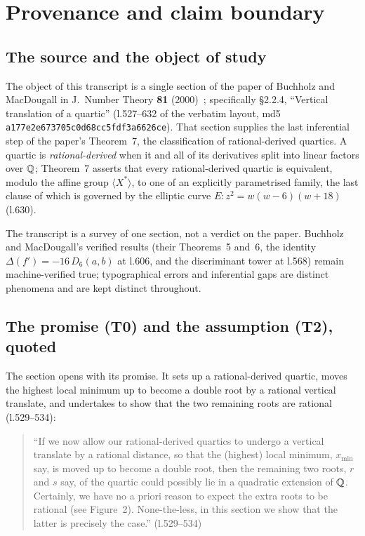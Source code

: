 \chapter{Provenance and claim boundary}\label{chap:provenance}

\section{The source and the object of study}

The object of this transcript is a single section of the paper of Buchholz and
MacDougall in J.\ Number Theory \textbf{81} (2000)~\cite{BuchholzMacDougall2000};
specifically \S2.2.4, ``Vertical translation of a quartic'' (l.527--632 of the
verbatim layout, md5 \texttt{a177e2e673705c0d68cc5fdf3a6626ce}).  That section supplies the last
inferential step of the paper's Theorem~7, the classification of rational-derived
quartics.  A quartic is \emph{rational-derived} when it and all of its derivatives
split into linear factors over $\mathbb{Q}$; Theorem~7 asserts that every rational-derived
quartic is equivalent, modulo the affine group $\langle X^{*}\rangle$, to one of an
explicitly parametrised family, the last clause of which is governed by the elliptic
curve $E\colon z^{2}=w(w-6)(w+18)$ (l.630).

The transcript is a survey of one section, not a verdict on the paper.  Buchholz and
MacDougall's verified results (their Theorems~5 and~6, the identity
$\Delta(f')=-16\,D_{6}(a,b)$ at l.606, and the discriminant tower at l.568) remain
machine-verified true; typographical errors and inferential gaps are distinct
phenomena and are kept distinct throughout.

\section{The promise (T0) and the assumption (T2), quoted}

The section opens with its promise.  It sets up a rational-derived quartic, moves the
highest local minimum up to become a double root by a rational vertical translate, and
undertakes to show that the two remaining roots are rational (l.529--534):

\begin{quote}
``If we now allow our rational-derived quartics to undergo a vertical translate by a
rational distance, so that the (highest) local minimum, $x_{\min}$ say, is moved up to
become a double root, then the remaining two roots, $r$ and $s$ say, of the quartic
could possibly lie in a quadratic extension of $\mathbb{Q}$. Certainly, we have no a priori
reason to expect the extra roots to be rational (see Figure~2). None-the-less, in this
section we show that the latter is precisely the case.'' \hfill (l.529--534)
\end{quote}

